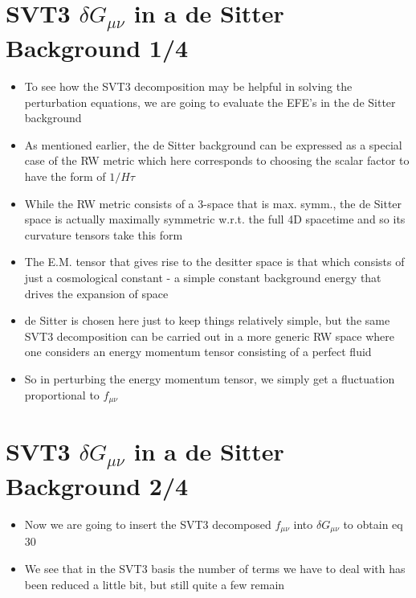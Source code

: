\documentclass[10pt,letterpaper]{article}
\numberwithin{equation}{section}
\begin{document}

\section{SVT3 $\delta G_{\mu\nu}$ in a de Sitter Background 1/4}
\begin{itemize}
	\item To see how the SVT3 decomposition may be helpful in solving the perturbation equations, we are going to evaluate the EFE's in the de Sitter background
	\item As mentioned earlier, the de Sitter background can be expressed as a special case of the RW metric which here corresponds to choosing the scalar factor to have the form of $1/H\tau$
	\item While the RW metric consists of a 3-space that is max. symm.,  the de Sitter space is actually maximally symmetric w.r.t. the full 4D spacetime and so its curvature tensors take this form
	\item The E.M. tensor that gives rise to the desitter space is that which consists of just a cosmological constant - a simple constant background energy that drives the expansion of space
	\item de Sitter is chosen here just to keep things relatively simple, but the same SVT3 decomposition can be carried out in a more generic RW space where one considers an energy momentum tensor consisting of a perfect fluid
	\item So in perturbing the energy momentum tensor, we simply get a fluctuation proportional to $f_{\mu\nu}$
\end{itemize}


\section{SVT3 $\delta G_{\mu\nu}$ in a de Sitter Background 2/4}
\begin{itemize}
	\item Now we are going to insert the SVT3 decomposed $f_{\mu\nu}$ into $\delta G_{\mu\nu}$ to obtain eq 30
	\item We see that in the SVT3 basis the number of terms we have to deal with has been reduced a little bit, but still quite a few remain
\end{itemize}
\end{document}
